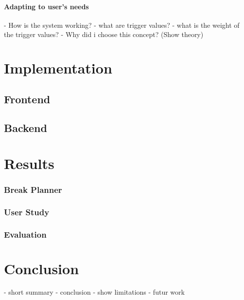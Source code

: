 \documentclass{hasel_thesis}
\begin{document}
\subsubsection{Adapting to user's needs}
- How is the system working?
- what are trigger values?
- what is the weight of the trigger values?
- Why did i choose this concept? (Show theory)

\chapter{Implementation}
\section{Frontend}
\section{Backend}
\chapter{Results}
\subsection{Break Planner}
\subsection{User Study}
\subsection{Evaluation}
\chapter{Conclusion}
%
- short summary
- conclusion
    - show limitations
- futur work



% 

\end{document}
